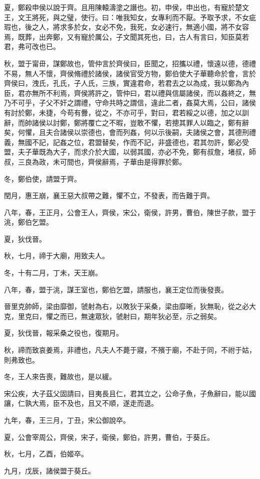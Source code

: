 \begin{pinyinscope}
夏，鄭殺申侯以說于齊。且用陳轅濤塗之譖也。初，申侯，申出也，有寵於楚文王，文王將死，與之璧，使行。曰：唯我知女，女專利而不厭。予取予求，不女疵瑕也，後之人，將求多於女，女必不免，我死，女必速行，無適小國，將不女容焉，既葬，出奔鄭，又有寵於厲公，子文聞其死也，曰，古人有言曰，知臣莫若君，弗可改也已。

秋，盟于甯毌，謀鄭故也，管仲言於齊侯曰，臣聞之，招攜以禮，懷遠以德，德禮不易，無人不懷，齊侯脩禮於諸侯，諸侯官受方物，鄭伯使大子華聽命於會，言於齊侯曰，洩氏，孔氏，子人氏，三族，實違君命，若君去之以為成，我以鄭為內臣，君亦無所不利焉，齊侯將許之，管仲曰，君以禮與信屬諸侯，而以姦終之，無乃不可乎，子父不奸之謂禮，守命共時之謂信，違此二者，姦莫大焉，公曰，諸侯有討於鄭，未捷，今苟有釁，從之，不亦可乎，對曰，君若綏之以德，加之以訓辭，而帥諸侯以討鄭，鄭將覆亡之不暇，豈敢不懼，若摠其罪人以臨之，鄭有辭矣，何懼，且夫合諸侯以崇德也，會而列姦，何以示後嗣，夫諸侯之會，其德刑禮義，無國不記，記姦之位，君盟替矣，作而不記，非盛德也，君其勿許，鄭必受盟，夫子華既為大子，而求介於大國，以弱其國，亦必不免，鄭有叔詹，堵叔，師叔，三良為政，未可間也，齊侯辭焉，子華由是得罪於鄭。

冬，鄭伯使，請盟于齊。

閏月，惠王崩，襄王惡大叔帶之難，懼不立，不發表，而告難于齊。

八年，春，王正月，公會王人，齊侯，宋公，衛侯，許男，曹伯，陳世子款，盟于洮，鄭伯乞盟。

夏，狄伐晉。

秋，七月，禘于大廟，用致夫人。

冬，十有二月，丁未，天王崩。

八年，春，盟于洮，謀王室也，鄭伯乞盟，請服也，襄王定位而後發喪。

晉里克帥師，梁由靡御，虢射為右，以敗狄于采桑，梁由靡晰，狄無恥，從之必大克，里克曰，懼之而已，無速眾狄，虢射曰，期年狄必至，示之弱矣。

夏，狄伐晉，報采桑之役也，復期月。

秋，禘而致哀姜焉，非禮也，凡夫人不薨于寢，不殯于廟，不赴于同，不祔于姑，則弗致也。

冬，王人來告喪，難故也，是以緩。

宋公疾，大子茲父固請曰，目夷長且仁，君其立之，公命子魚，子魚辭曰，能以國讓，仁孰大焉，臣不及也，且又不順，遂走而退。

九年，春，王三月，丁丑，宋公御說卒。

夏，公會宰周公，齊侯，宋子，衛侯，鄭伯，許男，曹伯，于葵丘。

秋，七月，乙酉，伯姬卒。

九月，戊辰，諸侯盟于葵丘。


\end{pinyinscope}
